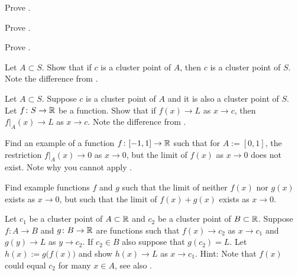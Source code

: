 \begin{exercise}
Prove .
\end{exercise}

\begin{exercise}
Prove .
\end{exercise}

\begin{exercise}
Prove .
\end{exercise}

\begin{exercise}
Let $A \subset S$.  Show that if $c$ is a cluster point of $A$, then $c$
is a cluster point of $S$.  Note the difference from
.
\end{exercise}

\begin{exercise} \label{exercise:restrictionlimitexercise}
Let $A \subset S$.  Suppose $c$ is a cluster point of $A$ and
it is also a cluster point of $S$.
Let $f \colon S \to {\mathbb{R}}$ be a function.  Show that if
$f(x) \to L$ as $x \to c$, then
$f|_A(x) \to L$ as $x \to c$.
Note the difference from
.
\end{exercise}

\begin{exercise}
Find an example of a function $f \colon [-1,1] \to {\mathbb{R}}$ such that
for $A:=[0,1]$, the restriction
$f|_A(x) \to 0$ as $x \to 0$, but the limit of $f(x)$ as $x \to 0$
does not exist.  Note why you cannot apply
.
\end{exercise}

\begin{exercise}
Find example functions $f$ and $g$ such that the limit of neither $f(x)$
nor $g(x)$ exists as $x \to 0$, but such that the limit of $f(x)+g(x)$ exists
as $x \to 0$.
\end{exercise}

\begin{exercise} \label{exercise:contlimitcomposition}
Let $c_1$ be a cluster point of $A \subset {\mathbb{R}}$ and $c_2$ be
a cluster point of $B \subset {\mathbb{R}}$.  Suppose 
$f \colon A \to B$ and $g \colon B \to {\mathbb{R}}$ are functions
such that
$f(x) \to c_2$ as $x \to c_1$ and
$g(y) \to L$ as $y \to c_2$.  If $c_2 \in B$ also suppose that $g(c_2) = L$.  Let $h(x) := g\bigl(f(x)\bigr)$ and show
$h(x) \to L$ as $x \to c_1$.
Hint: Note that $f(x)$ could equal $c_2$ for many $x \in A$,
see also
.
\end{exercise}

